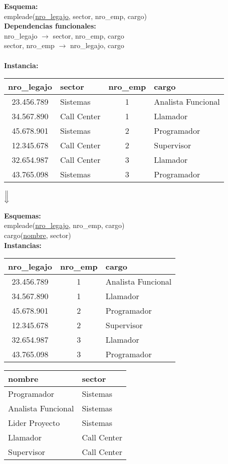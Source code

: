 \documentclass[preview]{standalone}
\begin{document}
\textbf{Esquema:}\\
empleade(\underline{nro\_legajo}, sector, nro\_emp, cargo)\\

\textbf{Dependencias funcionales:}\\
nro\_legajo $\rightarrow$ sector, nro\_emp, cargo\\
sector, nro\_emp $\rightarrow$ nro\_legajo, cargo\\
{\color{red}{cargo $\rightarrow$ sector}}\\

\textbf{Instancia:}
\begin{center}
\scriptsize
\begin{tabular}{| c | l | c | l |}\hline			
	nro\_legajo & sector & nro\_emp & cargo  \\\hline			
	23.456.789 & Sistemas & 1 & Analista Funcional \\
	34.567.890 & Call Center & 1 & Llamador \\
	45.678.901 & Sistemas & 2 & Programador \\
	12.345.678 & Call Center & 2 & Supervisor \\
	32.654.987 & Call Center & 3 & Llamador \\
	43.765.098 & Sistemas & 3 & Programador \\\hline
\end{tabular}



$\Big\Downarrow$
\end{center}

\textbf{Esquemas:}\\
empleade(\underline{nro\_legajo}, nro\_emp, cargo)\\
cargo(\underline{nombre}, sector)\\

\textbf{Instancias:}
\begin{center}
\scriptsize
\begin{tabular}{| c | c | l |}\hline			
	nro\_legajo & nro\_emp & cargo  \\\hline			
	23.456.789 & 1 & Analista Funcional \\
	34.567.890 & 1 & Llamador \\
	45.678.901 & 2 & Programador \\
	12.345.678 & 2 & Supervisor \\
	32.654.987 & 3 & Llamador \\
	43.765.098 & 3 & Programador \\\hline
\end{tabular}
\quad
\begin{tabular}{| l | l |}\hline
	nombre & sector \\\hline
	Programador & Sistemas\\
	Analista Funcional & Sistemas\\
	Lider Proyecto & Sistemas\\
	Llamador & Call Center\\	
	Supervisor & Call Center\\\hline		
\end{tabular}
\end{center}
\end{document}
